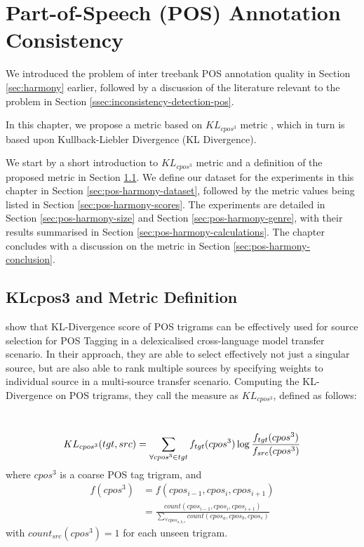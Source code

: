 \chapter{Part-of-Speech (POS) Annotation Consistency}
\label{chap:pos-harmony}

We introduced the problem of inter treebank POS annotation quality in Section \ref{sec:harmony} earlier, followed by a discussion of the literature relevant to the problem in Section \ref{ssec:inconsistency-detection-pos}. 

In this chapter, we propose a metric based on $KL_{cpos^3}$ metric \citep{klcpos3}, which in turn is based upon Kullback-Liebler Divergence (KL Divergence). 

We start by a short introduction to $KL_{cpos^3}$ metric and a definition of the proposed metric in Section \ref{sec:pos-harmony-definition}. We define our dataset for the experiments in this chapter in Section \ref{sec:pos-harmony-dataset}, followed by the metric values being listed in Section \ref{sec:pos-harmony-scores}. The experiments are detailed in Section \ref{sec:pos-harmony-size} and Section \ref{sec:pos-harmony-genre}, with their results summarised in Section \ref{sec:pos-harmony-calculations}. The chapter concludes with a discussion on the metric in Section \ref{sec:pos-harmony-conclusion}.

\section{KLcpos3 and Metric Definition}
\label{sec:pos-harmony-definition}

\cite{klcpos3} show that KL-Divergence score of POS trigrams can be effectively used for source selection for POS Tagging in a delexicalised cross-language model transfer scenario. In their approach, they are able to select effectively not just a singular source, but are also able to rank multiple sources by specifying weights to individual source in a multi-source transfer scenario. Computing the KL-Divergence on POS trigrams, they call the measure as $KL_{cpos^3}$, defined as follows:

\begin{definition}
\label{def:klcpos3}
\textbf{ }\\
\begin{equation}
\label{eqn:klcpos3}
\small KL_{cpos^3}(tgt, src) = \sum_{\forall cpos^3 \in tgt}^{}f_{tgt}(cpos^3)\log\frac{f_{tgt}(cpos^3)}{f_{src}(cpos^3)}
\end{equation}
where $cpos^3$ is a coarse POS tag trigram, and \\
\begin{align}
\label{eqn:cpos}
f(cpos^3) & = \nonumber f(cpos_{i-1}, cpos_{i}, cpos_{i+1}) \\ &= \frac{count(cpos_{i-1}, cpos_{i}, cpos_{i+1})}{\sum_{\forall cpos_{a,b,c}}{count(cpos_{a}, cpos_{b}, cpos_{c})}}
\end{align}
with $count_{src}(cpos^3) = 1$ for each unseen trigram.
\end{definition}

